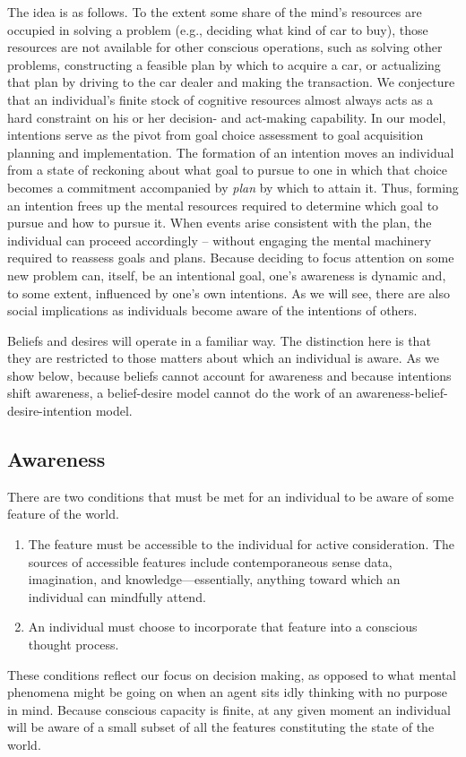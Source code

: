 \documentclass[
11pt,
titlepage,
reqno,
]{article}%
\theoremstyle{definition}
\begin{document}
The idea is as follows.
To the extent some share of the mind's resources are occupied in solving a problem (e.g., deciding what kind of car to buy), those resources are not available for other conscious operations, such as solving other problems, constructing a feasible plan by which to acquire a car, or actualizing that plan by driving to the car dealer and making the transaction.
We conjecture that an individual's finite stock of cognitive resources almost always acts as a hard constraint on his or her decision- and act-making capability.
In our model, intentions serve as the pivot from goal choice assessment to goal acquisition planning and implementation.
The formation of an intention moves an individual from a state of reckoning about what goal to pursue to one in which that choice becomes a commitment accompanied by \textit{plan} by which to attain it.
Thus, forming an intention frees up the mental resources required to determine which goal to pursue and how to pursue it.
When events arise consistent with the plan, the individual can proceed accordingly -- without engaging the mental machinery required to reassess goals and plans.
Because deciding to focus attention on some new problem can, itself, be an intentional goal, one's awareness is dynamic and, to some extent, influenced by one's own intentions.
As we will see, there are also social implications as individuals become aware of the intentions of others.  

Beliefs and desires will operate in a familiar way. 
The distinction here is that they are restricted to those matters about which an individual is aware.
As we show below, because beliefs cannot account for awareness and because intentions shift awareness, a belief-desire model cannot do the work of an awareness-belief-desire-intention model.

\subsection{Awareness}

There are two conditions that must be met for an individual to be aware of some feature of the world. 
\begin{enumerate}
	\item The feature must be accessible to the individual for active consideration. The sources of accessible features include contemporaneous sense data, imagination, and knowledge---essentially, anything toward which an individual can mindfully attend.
	\item An individual must choose to incorporate that feature into a conscious thought process.
\end{enumerate}
These conditions reflect our focus on decision making, as opposed to what mental phenomena might be going on when an agent sits idly thinking with no purpose in mind. 
Because conscious capacity is finite, at any given moment an individual will be aware of a small subset of all the features constituting the state of the world.
\end{document}
